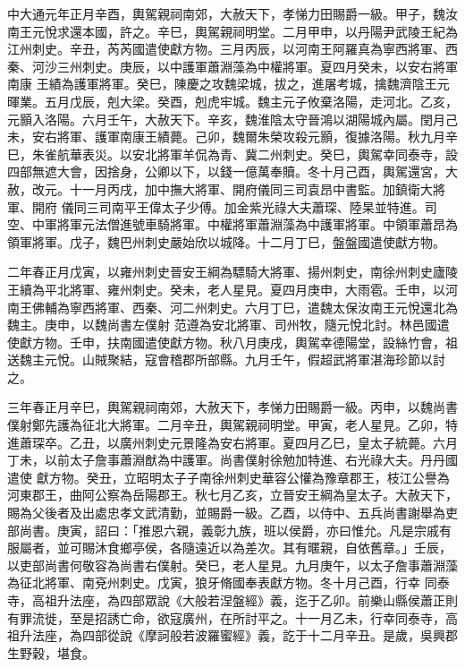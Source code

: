 \begin{pinyinscope}
 中大通元年正月辛酉，輿駕親祠南郊，大赦天下，孝悌力田賜爵一級。甲子，魏汝南王元悅求還本國，許之。辛巳，輿駕親祠明堂。二月甲申，以丹陽尹武陵王紀為江州刺史。辛丑，芮芮國遣使獻方物。三月丙辰，以河南王阿羅真為寧西將軍、西秦、河沙三州刺史。庚辰，以中護軍蕭淵藻為中權將軍。夏四月癸未，以安右將軍南康
 王績為護軍將軍。癸巳，陳慶之攻魏梁城，拔之，進屠考城，擒魏濟陰王元暉業。五月戊辰，剋大梁。癸酉，剋虎牢城。魏主元子攸棄洛陽，走河北。乙亥，元顥入洛陽。六月壬午，大赦天下。辛亥，魏淮陰太守晉鴻以湖陽城內屬。閏月己未，安右將軍、護軍南康王績薨。己卯，魏爾朱榮攻殺元顥，復據洛陽。秋九月辛巳，朱雀航華表災。以安北將軍羊侃為青、冀二州刺史。癸巳，輿駕幸同泰寺，設四部無遮大會，因捨身，公卿以下，以錢一億萬奉贖。冬十月己酉，輿駕還宮，大赦，改元。十一月丙戌，加中撫大將軍、開府儀同三司袁昂中書監。加鎮衛大將軍、開府
 儀同三司南平王偉太子少傅。加金紫光祿大夫蕭琛、陸杲並特進。司空、中軍將軍元法僧進號車騎將軍。中權將軍蕭淵藻為中護軍將軍。中領軍蕭昂為領軍將軍。戊子，魏巴州刺史嚴始欣以城降。十二月丁巳，盤盤國遣使獻方物。



 二年春正月戊寅，以雍州刺史晉安王綱為驃騎大將軍、揚州刺史，南徐州刺史廬陵王續為平北將軍、雍州刺史。癸未，老人星見。夏四月庚申，大雨雹。壬申，以河南王佛輔為寧西將軍、西秦、河二州刺史。六月丁巳，遣魏太保汝南王元悅還北為魏主。庚申，以魏尚書左僕射
 范遵為安北將軍、司州牧，隨元悅北討。林邑國遣使獻方物。壬申，扶南國遣使獻方物。秋八月庚戌，輿駕幸德陽堂，設絲竹會，祖送魏主元悅。山賊聚結，寇會稽郡所部縣。九月壬午，假超武將軍湛海珍節以討之。



 三年春正月辛巳，輿駕親祠南郊，大赦天下，孝悌力田賜爵一級。丙申，以魏尚書僕射鄭先護為征北大將軍。二月辛丑，輿駕親祠明堂。甲寅，老人星見。乙卯，特進蕭琛卒。乙丑，以廣州刺史元景隆為安右將軍。夏四月乙巳，皇太子統薨。六月丁未，以前太子詹事蕭淵猷為中護軍。尚書僕射徐勉加特進、右光祿大夫。丹丹國遣使
 獻方物。癸丑，立昭明太子子南徐州刺史華容公懽為豫章郡王，枝江公譽為河東郡王，曲阿公察為岳陽郡王。秋七月乙亥，立晉安王綱為皇太子。大赦天下，賜為父後者及出處忠孝文武清勤，並賜爵一級。乙酉，以侍中、五兵尚書謝舉為吏部尚書。庚寅，詔曰：「推恩六親，義彰九族，班以侯爵，亦曰惟允。凡是宗戚有服屬者，並可賜沐食鄉亭侯，各隨遠近以為差次。其有暱親，自依舊章。」壬辰，以吏部尚書何敬容為尚書右僕射。癸巳，老人星見。九月庚午，以太子詹事蕭淵藻為征北將軍、南兗州刺史。戊寅，狼牙脩國奉表獻方物。冬十月己酉，行幸
 同泰寺，高祖升法座，為四部眾說《大般若涅盤經》義，迄于乙卯。前樂山縣侯蕭正則有罪流徙，至是招誘亡命，欲寇廣州，在所討平之。十一月乙未，行幸同泰寺，高祖升法座，為四部從說《摩訶般若波羅蜜經》義，訖于十二月辛丑。是歲，吳興郡生野穀，堪食。




\end{pinyinscope}
